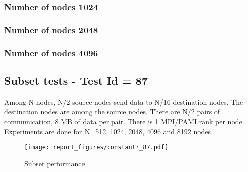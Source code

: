 \documentclass[letter]{article}
\begin{document}
\subsubsection{Number of nodes 1024}





\newpage

\subsubsection{Number of nodes 2048}





\newpage

\subsubsection{Number of nodes 4096}





\newpage


%

%


\subsection{Subset tests - Test Id = 87}

Among N nodes, N/2 source nodes send data to N/16 destination nodes. The destination nodes are among the source nodes. There are N/2 pairs of communication, 8 MB of data per pair. There is 1 MPI/PAMI rank per node. Experiments are done for N=512, 1024, 2048, 4096 and 8192 nodes.

\begin{figure}[h]
\vspace{-0.1in}
\centering
\texttt{[image: report\_figures/constantr\_87.pdf]}
\vspace{-0.1in}
\caption{Subset performance}
\vspace{-0.1in}
\label{fig:patterns}
\end{figure}
\end{document}
